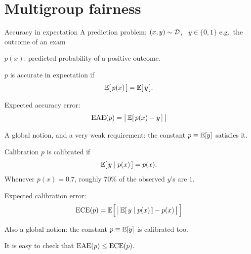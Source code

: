 
\section{Multigroup fairness}

\begin{frame}{Accuracy in expectation}
  A prediction problem: $(x,y) \sim \mathcal{D}$, \ $y \in \{0,1\}$
  \textcolor{muted}{\quad e.g.\ the outcome of an exam}

  \vspace{0.5em}
  $p(x)$: predicted probability of a positive outcome.

  \pause
  \vspace{0.8em}
  $p$ is \alert{accurate in expectation} if
  \[
    \mathbb{E}[\,p(x)\,] = \mathbb{E}[\,y\,].
  \]

  Expected accuracy error:
  \[
    \mathrm{EAE}(p) = \big|\,\mathbb{E}[\,p(x) - y\,]\,\big|
  \]

  \textcolor{muted}{A global notion, and a very weak requirement:
  the constant $p \equiv \mathbb{E}[y]$ satisfies it.}
\end{frame}

\begin{frame}{Calibration}
  $p$ is \alert{calibrated} if
  \[
    \mathbb{E}[\,y \mid p(x)\,] = p(x).
  \]
  Whenever $p(x) = 0.7$, roughly 70\% of the observed $y$'s are $1$.

  \vspace{0.5em}
  Expected calibration error:
  \[
    \mathrm{ECE}(p) = \mathbb{E}\Big[\,\big|\,\mathbb{E}[\,y \mid p(x)\,] - p(x)\,\big|\,\Big]
  \]

  \textcolor{muted}{Also a global notion: the constant $p \equiv \mathbb{E}[y]$
  is calibrated too.}

  \vspace{0.5em}
  It is easy to check that $\mathrm{EAE}(p) \le \mathrm{ECE}(p)$.
\end{frame}


